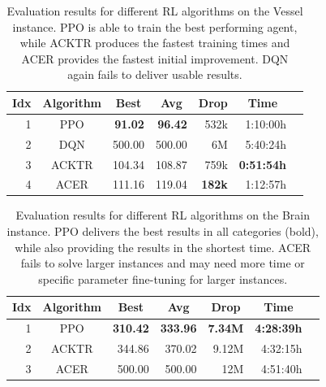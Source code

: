 \begin{table}[htp]
    \begin{center}
        \begin{tabular}{rcrrrrr}
            \toprule
            \multicolumn{1}{c}{Idx} & \multicolumn{1}{c}{Algorithm} & \multicolumn{1}{c}{Best} & \multicolumn{1}{c}{Avg} & \multicolumn{1}{c}{Drop} & \multicolumn{1}{c}{Time}\\
            \midrule
            1 & PPO & \textbf{91.02} & \textbf{96.42} & 532k & 1:10:00h \\
            2 & DQN & 500.00 & 500.00 & 6M & 5:40:24h \\
            3 & ACKTR & 104.34 & 108.87 & 759k & \textbf{0:51:54h} \\
            4 & ACER & 111.16 & 119.04 & \textbf{182k} & 1:12:57h \\
            \bottomrule
        \end{tabular}
    \end{center}
    \caption[Evaluation of RL Algorithms on the Vessel Instance]{Evaluation results for different RL algorithms on the Vessel instance. PPO is able to train the best performing agent, while ACKTR produces the fastest training times and ACER provides the fastest initial improvement. DQN again fails to deliver usable results.} \label{tab:AlgorithmEval/VesselMaze02}
\end{table}

\begin{table}[htp]
    \begin{center}
        \begin{tabular}{rcrrrrr}
            \toprule
            \multicolumn{1}{c}{Idx} & \multicolumn{1}{c}{Algorithm} & \multicolumn{1}{c}{Best} & \multicolumn{1}{c}{Avg} & \multicolumn{1}{c}{Drop} &  \multicolumn{1}{c}{Time}\\
            \midrule
            1 & PPO & \textbf{310.42} & \textbf{333.96} & \textbf{7.34M} & \textbf{4:28:39h} \\
            2 & ACKTR & 344.86 & 370.02 & 9.12M & 4:32:15h \\
            3 & ACER & 500.00 & 500.00 & 12M & 4:51:40h \\
            \bottomrule
        \end{tabular}
    \end{center}
    \caption[Evaluation of RL Algorithms on the Brain Instance]{Evaluation results for different RL algorithms on the Brain instance. PPO delivers the best results in all categories (bold), while also providing the results in the shortest time. ACER fails to solve larger instances and may need more time or specific parameter fine-tuning for larger instances.} \label{tab:AlgorithmEval/Maze0122}
\end{table}

